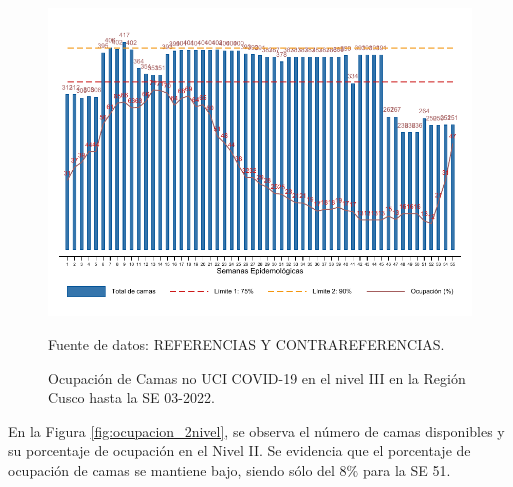 \documentclass[12pt,a4paper,openany]{book}
\begin{document}
\begin{figure}[htpb]
	\caption{Ocupación de Camas no UCI COVID-19 en el nivel III en la Región Cusco hasta la SE 03-2022.}\label{fig:ocupacion_3_nivel}
	\begin{center}
		\includegraphics[width=0.95\linewidth]{../figuras/nivel_3.pdf}
	\end{center}
	{\footnotesize {Fuente de datos: REFERENCIAS Y CONTRAREFERENCIAS.}}
\end{figure}

\clearpage

En la Figura \ref{fig:ocupacion_2nivel}, se observa el número de camas disponibles y su porcentaje de ocupación en el Nivel II. Se evidencia que el porcentaje de ocupación de camas se mantiene bajo, siendo sólo del 8$\%$ para la SE 51. 
\end{document}
